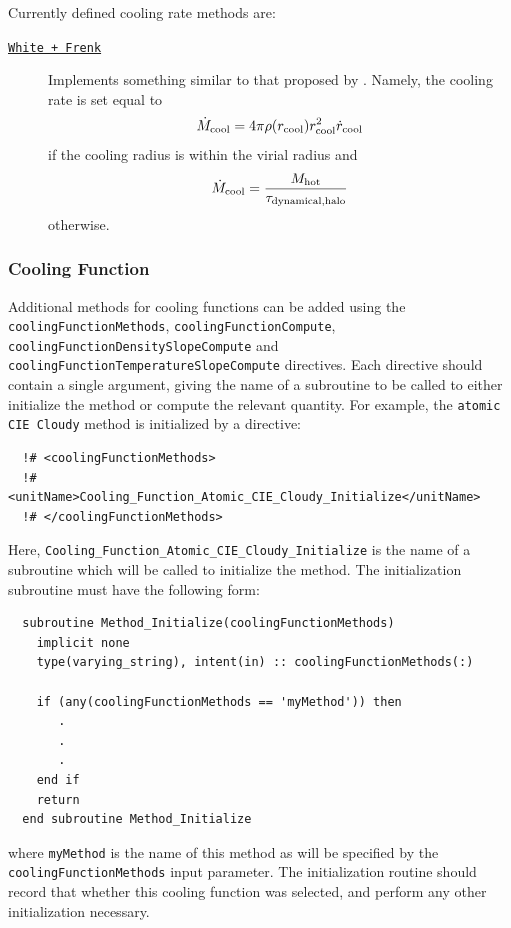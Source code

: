 Currently defined cooling rate methods are:
\begin{description}
 \item [\hyperlink{cooling.cooling_rate.White-Frenk.F90:cooling_rates_white_frenk:cooling_rate_white_frenk}{{\tt White + Frenk}}] Implements something similar to that proposed by \cite{white_galaxy_1991}. Namely, the cooling rate is set equal to
 \begin{equation}
  \dot{M}_{\rm cool} = 4 \pi \rho(r_{\rm cool}) r_{\rm cool}^2 \dot{r}_{\rm cool}
 \end{equation}
 if the cooling radius is within the virial radius and
 \begin{equation}
  \dot{M}_{\rm cool} = {M_{\rm hot} \over \tau_{\rm dynamical,halo}}
 \end{equation}
 otherwise.
\end{description}

\subsubsection{Cooling Function}\label{sec:CoolingFunctionMethods}

Additional methods for cooling functions can be added using the {\tt coolingFunctionMethods}, {\tt coolingFunctionCompute}, {\tt coolingFunctionDensitySlopeCompute} and {\tt coolingFunctionTemperatureSlopeCompute} directives. Each directive should contain a single argument, giving the name of a subroutine to be called to either initialize the method or compute the relevant quantity. For example, the {\tt atomic CIE Cloudy} method is initialized by a directive:
\begin{verbatim}
  !# <coolingFunctionMethods>
  !#  <unitName>Cooling_Function_Atomic_CIE_Cloudy_Initialize</unitName>
  !# </coolingFunctionMethods>
\end{verbatim}
Here, {\tt Cooling\_Function\_Atomic\_CIE\_Cloudy\_Initialize} is the name of a subroutine which will be called to initialize the method. The initialization subroutine must have the following form:
\begin{verbatim}
  subroutine Method_Initialize(coolingFunctionMethods)
    implicit none
    type(varying_string), intent(in) :: coolingFunctionMethods(:)
    
    if (any(coolingFunctionMethods == 'myMethod')) then
       .
       .
       .
    end if
    return
  end subroutine Method_Initialize
\end{verbatim}
where {\tt myMethod} is the name of this method as will be specified by the {\tt coolingFunctionMethods} input parameter. The initialization routine should record that whether this cooling function was selected, and perform any other initialization necessary.

